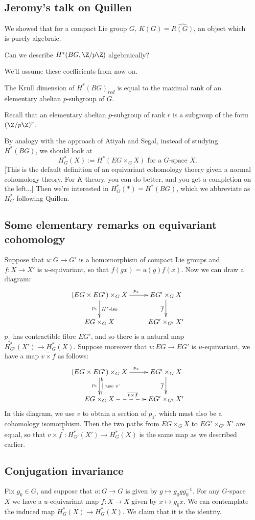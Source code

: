 \documentclass[11pt]{article}
\newcommand{\KanSemResponse}[1]
{
\thispagestyle{fancy}
\subsection*{#1}
}
\begin{document}
\begin{JeromyQuillen}
\KanSemResponse
{Jeromy's talk on Quillen}
We showed that for a compact Lie group $G$, $K(G)=\widehat{R(G)}$, an object which is purely algebraic.
\begin{question}
Can we describe $H^*(BG,\Z/p\Z)$ algebraically?
\end{question}
We'll assume these coefficients from now on.
\begin{conjecture}
The Krull dimension of $H^*(BG)_{red}$ is equal to the maximal rank of an elementary abelian $p$-subgroup of $G$.
\end{conjecture}
\noindent Recall that an elementary abelian $p$-subgroup of rank $r$ is a subgroup of the form $(\Z/p\Z)^r$.

By analogy with the approach of Atiyah and Segal, instead of studying $H^*(BG)$, we should look at 
\[H^*_G(X):=H^*(EG\times_G X)\text{ for a $G$-space $X$}.\]
[This is the default definition of an equivariant cohomology thoery given a normal cohomology theory. For $K$-theory, you can do better, and you get a completion on the left...]
Then we're interested in $H^*_G(\ast)=H^*(BG)$, which we abbreviate as $H_G^*$ following Quillen.
\subsection*{Some elementary remarks on equivariant cohomology}
Suppose that $u:G\to G'$ is a homomorphism of compact Lie groups and $f:X\to X'$ is $u$-equivariant, so that $f(gx)=u(g)f(x)$. Now we can draw a diagram:
\[\xymatrix{
(EG\times EG')\times_G X\ar[r]^{\ \ \ p_2}\ar[d]_{p_1}^{\text{$H^*$-iso}}&EG'\times_GX\ar[d]_{\overline f}\\
EG\times_G X&EG'\times_{G'}X'
}\]
$p_1$ has contractible fibre $EG'$, and so there is a natural map $H^*_{G'}(X')\to H^*_{G}(X)$. Suppose moreover that $v:EG\to EG'$ is $u$-equivariant, we have a map ${\overline{v\times f}}$ as follows:
\[\xymatrix{
(EG\times EG')\times_G X\ar[r]^{\ \ \ p_2}\ar[d]_{p_1}&EG'\times_GX\ar[d]_{\overline f}\\
\ar@/_1ex/[u]_{\text{`use $v$'}}\ar@{-->}[r]^{\overline{v\times f}}EG\times_G X&EG'\times_{G'}X'
}\]
In this diagram, we use $v$ to obtain a section of $p_1$, which must also be a cohomology isomorphism. Then the two paths from $EG\times_G X$ to $EG'\times_{G'}X'$ are equal, so that $\overline{v\times f}^*:H^*_{G'}(X')\to H^*_{G}(X)$ is the same map as we described earlier.
\subsection*{Conjugation invariance}
Fix $g_0\in G$, and suppose that $u:G\to G$ is given by $g\mapsto g_0gg_0^{-1}$. For any $G$-space $X$ we have a $u$-equivariant map $f:X\to X$ given by $x\mapsto g_0x$. We can contemplate the induced map $H^*_G(X)\to H^*_G(X)$. We claim that it is the identity.


\end{JeromyQuillen}
\end{document}
